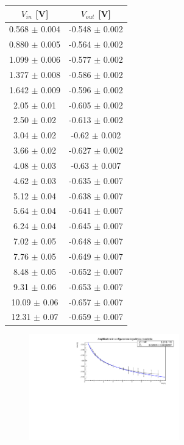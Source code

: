 \documentclass[journal]{IEEEtran}
\begin{document}
\begin{tabular}{|c|c|}
\hline
\multicolumn{1}{|c|}{$V_{in}$ {[}V{]}} & \multicolumn{1}{c|}{$V_{out}$ {[}V{]}} \\ \hline
0.568 $\pm$ 0.004 & -0.548 $\pm$ 0.002  \\ \hline
0.880 $\pm$ 0.005 & -0.564 $\pm$ 0.002 \\ \hline
1.099 $\pm$ 0.006 & -0.577 $\pm$ 0.002 \\ \hline
1.377 $\pm$ 0.008 & -0.586 $\pm$ 0.002 \\ \hline
1.642 $\pm$ 0.009 & -0.596 $\pm$ 0.002 \\ \hline
2.05 $\pm$ 0.01 & -0.605 $\pm$ 0.002 \\ \hline
2.50 $\pm$ 0.02 & -0.613 $\pm$ 0.002 \\ \hline
3.04 $\pm$ 0.02 & -0.62 $\pm$ 0.002 \\ \hline
3.66 $\pm$ 0.02 & -0.627 $\pm$ 0.002 \\ \hline
4.08 $\pm$ 0.03 & -0.63 $\pm$ 0.007 \\ \hline
4.62 $\pm$ 0.03 & -0.635 $\pm$ 0.007 \\ \hline
5.12 $\pm$ 0.04 & -0.638 $\pm$ 0.007 \\ \hline
5.64 $\pm$ 0.04 & -0.641 $\pm$ 0.007 \\ \hline
6.24 $\pm$ 0.04 & -0.645 $\pm$ 0.007 \\ \hline
7.02 $\pm$ 0.05 & -0.648 $\pm$ 0.007 \\ \hline
7.76 $\pm$ 0.05 & -0.649 $\pm$ 0.007 \\ \hline
8.48 $\pm$ 0.05 & -0.652 $\pm$ 0.007 \\ \hline
9.31 $\pm$ 0.06 & -0.653 $\pm$ 0.007 \\ \hline
10.09 $\pm$ 0.06 & -0.657 $\pm$ 0.007 \\ \hline
12.31 $\pm$ 0.07 & -0.659 $\pm$ 0.007 \\ \hline
\end{tabular}

\begin{figure}[H]%
\begin {center}
\includegraphics[width=0.58\textwidth]{analysis/output/fit_log_vout_vin.pdf}
\caption{}
\label{fig:oscilloscope}
\end {center}
\end{figure}
\end{document}
